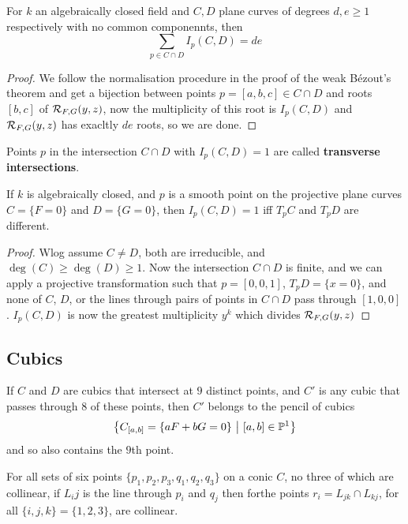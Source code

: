 \documentclass{article}
\begin{document}
\begin{theorem}
    For $k$ an algebraically closed field and $C,D$ plane curves of degrees $d,e\geq 1$ respectively with no common componennts, then \[
    \sum_{p\in C\cap D} I_p(C,D) = de
    \]\begin{proof}
        We follow the normalisation procedure in the proof of the weak B\'ezout's theorem and get a bijection between points $p = [a,b,c]\in C\cap D$ and roots $[b,c]$ of $\mathcal{R}_{F,G}(y,z)$, now the multiplicity of this root is $I_p(C,D)$ and $\mathcal{R}_{F,G}(y,z)$ has exacltly $de$ roots, so we are done.
    \end{proof}
\end{theorem}

Points $p$ in the intersection $C\cap D$ with $I_p(C,D)=1$ are called \textbf{transverse intersections}.

\begin{proposition}
    If $k$ is algebraically closed, and $p$ is a smooth point on the projective plane curves $C=\{F=0\}$ and $D=\{G=0\}$, then $I_p(C,D)=1$ iff $T_pC$ and $T_p D$ are different.
    \begin{proof}
        Wlog assume $C\neq D$, both are irreducible, and $\deg(C)\geq \deg(D) \geq 1$. Now the intersection $C\cap D$ is finite, and we can apply a projective transformation such that $p=[0,0,1]$, $T_pD = \{x= 0\}$, and none of $C$, $D$, or the lines through pairs of points in $C\cap D$ pass through $[1,0,0]$.  $I_p(C,D)$ is now the greatest multiplicity $y^k$ which divides $\mathcal{R}_{F,G}(y,z)$
    \end{proof}
\end{proposition}

\subsection{Cubics}

\begin{theorem}
    If $C$ and $D$ are cubics that intersect at $9$ distinct points, and $C'$ is any cubic that passes through $8$ of these points, then $C'$ belongs to the pencil of cubics \[
    \left\{C_{[a,b]} = \{aF + bG = 0 \} \ \middle| \ [a,b]\in \bP^1\right\}
    \] and so also contains the $9$th point.
\end{theorem}

\begin{theorem}
    For all sets of six points $\{p_1,p_2,p_3,q_1,q_2,q_3\}$ on a conic $C$, no three of which are collinear, if $L_ij$ is the line through $p_i$ and $q_j$ then forthe points $r_i = L_{jk}\cap L_{kj}$, for all $\{i,j,k\}=\{1,2,3\}$, are collinear.
\end{theorem}
\end{document}
